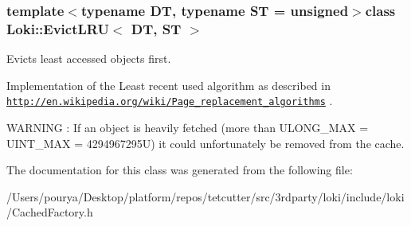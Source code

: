 \subsubsection*{template$<$typename D\+T, typename S\+T = unsigned$>$class Loki\+::\+Evict\+L\+R\+U$<$ D\+T, S\+T $>$}

Evicts least accessed objects first. 

Implementation of the Least recent used algorithm as described in \href{http://en.wikipedia.org/wiki/Page_replacement_algorithms}{\tt http\+://en.\+wikipedia.\+org/wiki/\+Page\+\_\+replacement\+\_\+algorithms} .

W\+A\+R\+N\+I\+N\+G \+: If an object is heavily fetched (more than U\+L\+O\+N\+G\+\_\+\+M\+A\+X = U\+I\+N\+T\+\_\+\+M\+A\+X = 4294967295\+U) it could unfortunately be removed from the cache. 

The documentation for this class was generated from the following file\+:\begin{DoxyCompactItemize}
\item 
/\+Users/pourya/\+Desktop/platform/repos/tetcutter/src/3rdparty/loki/include/loki/Cached\+Factory.\+h\end{DoxyCompactItemize}
